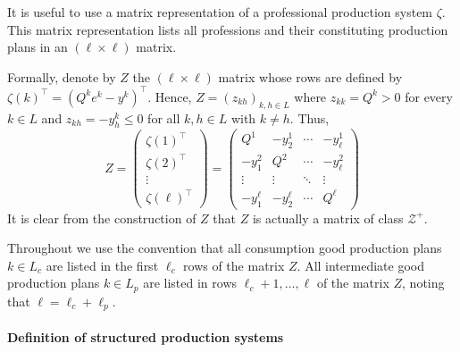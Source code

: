 \documentclass[11pt,fleqn]{article}
\begin{document}
It is useful to use a matrix representation of a professional production system $\zeta$. This matrix representation lists all professions and their constituting production plans in an $( \ell \times \ell)$ matrix.  

Formally, denote by $Z$ the $(\ell \times \ell)$ matrix whose rows are defined by $\zeta (k)^\top = (Q^k e^k - y^k)^\top$. Hence, $Z = (z_{kh})_{k,h \in L}$ where $z_{kk} = Q^k >0$ for every $k \in L$ and $z_{kh} = -y^k_h \leqslant 0$ for all $k,h \in L$ with $k \neq h$. Thus,
\begin{equation} \label{eq:Z-matrix}
Z = \begin{pmatrix}
\zeta(1)^\top \\
\zeta(2)^\top \\
\vdots  \\
\zeta(\ell)^\top
\end{pmatrix}=
\begin{pmatrix}
Q^1 & -y^1_2 & \cdots & - y^1_\ell \\
-y^2_1 & Q^2 & \cdots & - y^2_\ell \\
\vdots & \vdots & \ddots & \vdots \\
-y^\ell_1 & -y^\ell_2 & \cdots & Q^\ell
\end{pmatrix}
\end{equation}
It is clear from the construction of $Z$ that $Z$ is actually a matrix of class $\mathcal Z^+$.

Throughout we use the convention that all consumption good production plans $k \in L_c$ are listed in the first $\ell_c$ rows of the matrix $Z$. All intermediate good production plans $k \in L_p$ are listed in rows $\ell_c+1, \ldots , \ell$ of the matrix $Z$, noting that $\ell = \ell_c + \ell_p$.



\paragraph{Definition of structured production systems}
\end{document}
